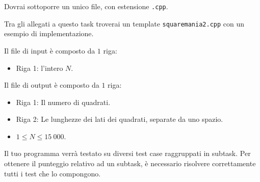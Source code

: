 Dovrai sottoporre un unico file, con estensione \texttt{.cpp}.

\begin{warning}
    Tra gli allegati a questo task troverai un template \texttt{squaremania2.cpp} con un esempio di implementazione.
\end{warning}

Il file di input è composto da $1$ riga:
\begin{itemize}
    \item Riga 1: l'intero $N$.
\end{itemize}

Il file di output è composto da $1$ riga:
\begin{itemize}
    \item Riga 1: Il numero di quadrati.
    \item Riga 2: Le lunghezze dei lati dei quadrati, separate da uno spazio.
\end{itemize}


\Constraints

\begin{itemize}[nolistsep, itemsep=2mm]
    \item $1 \le N \le 15\:000$.
\end{itemize}


\Scoring

Il tuo programma verrà testato su diversi test case raggruppati in subtask.
Per ottenere il punteggio relativo ad un subtask,
è necessario risolvere correttamente tutti i test che lo compongono.






\Examples

\begin{example}
\end{example}

